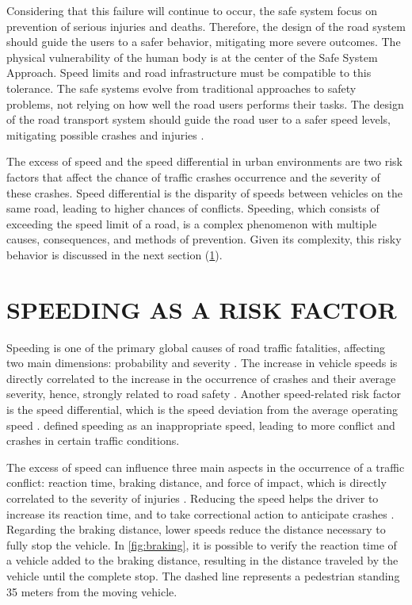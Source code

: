 Considering that this failure will continue to occur, the safe system focus on prevention of serious injuries and deaths. Therefore, the design of the road system should guide the users to a safer behavior, mitigating more severe outcomes. The physical vulnerability of the human body is at the center of the Safe System Approach. Speed limits and road infrastructure must be compatible to this tolerance. The safe systems evolve from traditional approaches to safety problems, not relying on how well the road users performs their tasks. The design of the road transport system should guide the road user to a safer speed levels, mitigating possible crashes and injuries \cite{international_transport_forum_towards_2008,wegmanFutureRoadSafety2017}. 

The excess of speed and the speed differential in urban environments are two risk factors that affect the chance of traffic crashes occurrence and the severity of these crashes. Speed differential is the disparity of speeds between vehicles on the same road, leading to higher chances of conflicts. Speeding, which consists of exceeding the speed limit of a road, is a complex phenomenon with multiple causes, consequences, and methods of prevention. Given its complexity, this risky behavior is discussed in the next section (\ref{speeding}). 

\section{SPEEDING AS A RISK FACTOR} \label{speeding}

Speeding is one of the primary global causes of road traffic fatalities, affecting two main dimensions: probability and severity \cite{WHO2013}. The increase in vehicle speeds is directly correlated to the increase in the occurrence of crashes and their average severity, hence, strongly related to road safety \cite{Mohan2016a}. Another speed-related risk factor is the speed differential, which is the speed deviation from the average operating speed \cite{Shinar2017}. \textcite{Ferraz2012} defined speeding as an inappropriate speed, leading to more conflict and crashes in certain traffic conditions. 

The excess of speed can influence three main aspects in the occurrence of a traffic conflict: reaction time, braking distance, and force of impact, which is directly correlated to the severity of injuries \cite{Mohan2016a}. Reducing the speed helps the driver to increase its reaction time, and to take correctional action to anticipate crashes \cite{Elvik2009}. Regarding the braking distance, lower speeds reduce the distance necessary to fully stop the vehicle. In \autoref{fig:braking}, it is possible to verify the reaction time of a vehicle added to the braking distance, resulting in the distance traveled by the vehicle until the complete stop. The dashed line represents a pedestrian standing 35 meters from the moving vehicle. 


